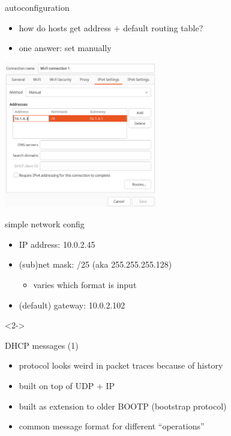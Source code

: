 \usetikzlibrary{matrix}
\begin{frame}{autoconfiguration}
    \begin{itemize}
    \item how do hosts get address + default routing table?
    \item one answer: set manually
    \end{itemize}
\includegraphics[width=0.5\textwidth]{../arp/ip-config-dialog}
\end{frame}

\begin{frame}{simple network config}
\begin{itemize}
    \item IP address: 10.0.2.45
    \item (sub)net mask: /25 (aka 255.255.255.128)
        \begin{itemize}
        \item varies which format is input
        \end{itemize}
    \item (default) gateway: 10.0.2.102
\end{itemize}
\begin{visibleenv}<2->
\end{visibleenv}
\end{frame}

\begin{frame}{DHCP messages (1)}
    \begin{itemize}
    \item protocol looks weird in packet traces because of history
    \item built on top of UDP + IP
    \item built as extension to older BOOTP (bootstrap protocol)
    \vspace{.5cm}
    \item common message format for different ``operations''
    \end{itemize}
\end{frame}

